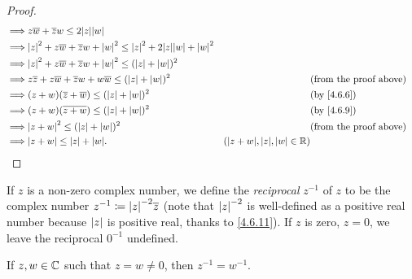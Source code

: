 \begin{proof}
\begin{align*}
    \implies & z \overline{w} + \overline{z} w \leq 2 \abs{z} \abs{w}                                                                                                                          \\
    \implies & \abs{z}^2 + z \overline{w} + \overline{z} w + \abs{w}^2 \leq \abs{z}^2 + 2 \abs{z} \abs{w} + \abs{w}^2                                                                          \\
    \implies & \abs{z}^2 + z \overline{w} + \overline{z} w + \abs{w}^2 \leq (\abs{z} + \abs{w})^2                                                                                              \\
    \implies & z \overline{z} + z \overline{w} + \overline{z} w + w \overline{w} \leq (\abs{z} + \abs{w})^2           &                                        & \text{(from the proof above)} \\
    \implies & (z + w) (\overline{z} + \overline{w}) \leq (\abs{z} + \abs{w})^2                                       &                                        & \text{(by \cref{4.6.6})}      \\
    \implies & (z + w) (\overline{z + w}) \leq (\abs{z} + \abs{w})^2                                                  &                                        & \text{(by \cref{4.6.9})}      \\
    \implies & \abs{z + w}^2 \leq (\abs{z} + \abs{w})^2                                                               &                                        & \text{(from the proof above)} \\
    \implies & \abs{z + w} \leq \abs{z} + \abs{w}.                                                                    & (\abs{z + w}, \abs{z}, \abs{w} \in \R)
  \end{align*}
\end{proof}

\begin{defn}\label{4.6.12}
  If \(z\) is a non-zero complex number, we define the \emph{reciprocal} \(z^{-1}\) of \(z\) to be the complex number \(z^{-1} \coloneqq \abs{z}^{-2} \overline{z}\)
  (note that \(\left\lvert z\right\rvert^{-2}\) is well-defined as a positive real number because \(\left\lvert z\right\rvert\) is positive real, thanks to \cref{4.6.11}).
  If \(z\) is zero, \(z = 0\), we leave the reciprocal \(0^{-1}\) undefined.
\end{defn}

\begin{ac}\label{ac:4.6.5}
  If \(z, w \in \mathbb{C}\) such that \(z = w \neq 0\), then \(z^{-1} = w^{-1}\).
\end{ac}

